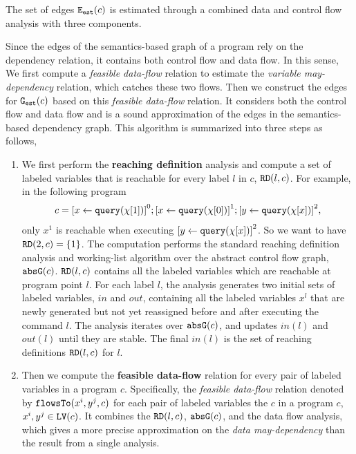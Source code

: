 The set of edges $\mathtt{{E_{est}}}(c)$ is estimated through a combined data and control flow analysis with three components.

Since the edges of the semantics-based graph of a program rely on the dependency relation, it contains both control flow and data flow. 
In this sense, We first compute a \emph{feasible data-flow} relation to estimate the \emph{variable may-dependency} relation, which catches these two flows.
Then we construct the edges for $\mathtt{{G_{est}}}(c)$ based on this \emph{feasible data-flow} relation.
It 
considers both the control flow and data flow and
is a sound approximation of the edges in the semantics-based dependency graph.
This algorithm is summarized into three steps as follows,
\begin{enumerate}
 \item 
 We first perform the \textbf{reaching definition} analysis and compute a set of labeled variables that is reachable for every label $l$ in $c$, $\mathtt{RD}(l, c)$.
 For example, in the following program
 \[
 c = \clabel{\assign{x}{\query(\chi[1])}}^0 ;\clabel{\assign{x}{\query(\chi[0])}}^1 ;
 \clabel{\assign{y}{\query(\chi[x])}}^2,
 \]
 only $x^1$ is reachable when executing $\clabel{\assign{y}{\query(\chi[x])}}^2$.
 So we want to have $\mathtt{RD}(2, c) = \{1\}$.
The computation performs the standard reaching definition analysis and working-list algorithm over the abstract control flow graph, $\mathtt{abs}{\mathtt{G}}(c)$. 
 $\mathtt{RD}(l, c)$ contains all the labeled variables which are reachable at program point $l$. 
 For each label $l$, the analysis generates two initial sets of labeled variables, $in$ and $out$, 
 containing all the labeled variables $x^l$ that are newly generated but not yet reassigned before and after executing the command $l$.
 The analysis iterates over $\mathtt{abs}{\mathtt{G}}(c)$, and updates $in(l)$ and $out(l)$ until they are stable.
 The final $in(l)$ is the set of reaching definitions $\mathtt{RD}(l, c)$ for $l$. 
 \item 
 Then we compute the \textbf{feasible data-flow} relation
 for every pair of labeled variables in a program $c$.
 Specifically, the \emph{feasible data-flow} relation denoted by
 $\mathtt{flowsTo}(x^i, y^j, c)$ for each pair of labeled variables the $c$ in a program $c$, $x^i, y^j \in \mathtt{LV}(c)$.
 It combines the $\mathtt{RD}(l, c)$, $\mathtt{abs}{\mathtt{G}}(c)$, and the data flow analysis, which gives a more precise approximation on the \emph{data may-dependency} than the result from a single analysis.

\end{enumerate}
